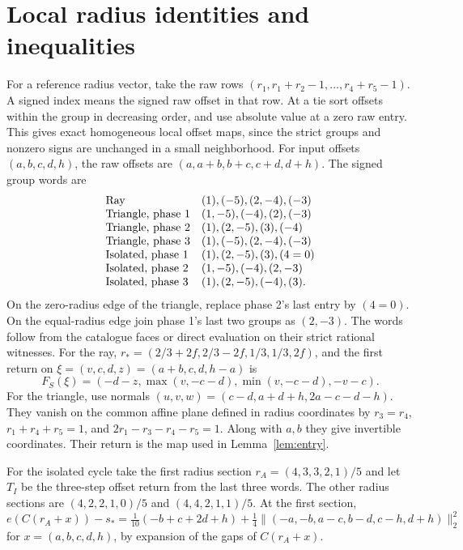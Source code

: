 \documentclass[11pt,reqno]{amsart}
\theoremstyle{remark}
\begin{document}
\section{Local radius identities and inequalities}\label{ap:radii}

For a reference radius vector, take the raw rows \((r_1,r_1+r_2-1,\ldots,r_4+r_5-1)\). A signed index means the signed raw offset in that row. At a tie sort offsets within the group in decreasing order, and use absolute value at a zero raw entry. This gives exact homogeneous local offset maps, since the strict groups and nonzero signs are unchanged in a small neighborhood. For input offsets \((a,b,c,d,h)\), the raw offsets are \((a,a+b,b+c,c+d,d+h)\). The signed group words are
\[
\begin{array}{@{}ll@{}}
\text{Ray}&(1),(-5),(2,-4),(-3)\\
\text{Triangle, phase 1}&(1,-5),(-4),(2),(-3)\\
\text{Triangle, phase 2}&(1),(2,-5),(3),(-4)\\
\text{Triangle, phase 3}&(1),(-5),(2,-4),(-3)\\
\text{Isolated, phase 1}&(1),(2,-5),(3),(4=0)\\
\text{Isolated, phase 2}&(1,-5),(-4),(2,-3)\\
\text{Isolated, phase 3}&(1),(2,-5),(-4),(3).
\end{array}
\]
On the zero-radius edge of the triangle, replace phase 2's last entry by \((4=0)\). On the equal-radius edge join phase 1's last two groups as \((2,-3)\). The words follow from the catalogue faces or direct evaluation on their strict rational witnesses. For the ray, \(r_*=(2/3+2f,2/3-2f,1/3,1/3,2f)\), and the first return on \(\xi=(v,c,d,z)=(a+b,c,d,h-a)\) is
\[
 F_S(\xi)=(-d-z,\max(v,-c-d),\min(v,-c-d),-v-c).
\]
For the triangle, use normals \((u,v,w)=(c-d,a+d+h,2a-c-d-h)\). They vanish on the common affine plane defined in radius coordinates by \(r_3=r_4\), \(r_1+r_4+r_5=1\), and \(2r_1-r_3-r_4-r_5=1\). Along with \(a,b\) they give invertible coordinates. Their return is the map used in Lemma~\ref{lem:entry}.

For the isolated cycle take the first radius section \(r_A=(4,3,3,2,1)/5\) and let \(T_I\) be the three-step offset return from the last three words. The other radius sections are \((4,2,2,1,0)/5\) and \((4,4,2,1,1)/5\). At the first section,
\[
 e(C(r_A+x))-s_* =
 \tfrac1{10}(-b+c+2d+h)+\tfrac14\|(-a,-b,a-c,b-d,c-h,d+h)\|_2^2
\]
for \(x=(a,b,c,d,h)\), by expansion of the gaps of \(C(r_A+x)\).
\end{document}
